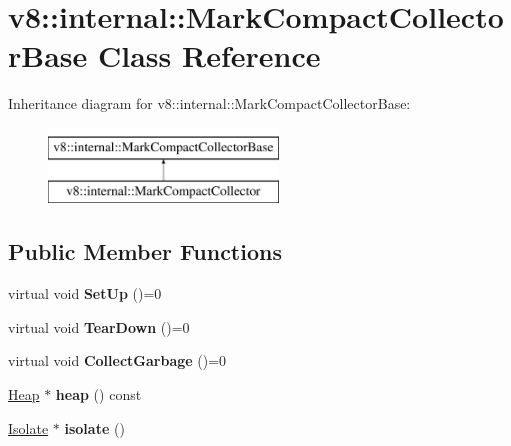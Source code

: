 \hypertarget{classv8_1_1internal_1_1MarkCompactCollectorBase}{}\section{v8\+:\+:internal\+:\+:Mark\+Compact\+Collector\+Base Class Reference}
\label{classv8_1_1internal_1_1MarkCompactCollectorBase}
Inheritance diagram for v8\+:\+:internal\+:\+:Mark\+Compact\+Collector\+Base\+:\begin{figure}[H]
\begin{center}
\leavevmode
\includegraphics[height=2.000000cm]{classv8_1_1internal_1_1MarkCompactCollectorBase}
\end{center}
\end{figure}
\subsection*{Public Member Functions}
\begin{DoxyCompactItemize}
\item 
\mbox{\label{classv8_1_1internal_1_1MarkCompactCollectorBase_ace841a22145c47a627b29cfe3a0758b0}} 
virtual void {\bfseries Set\+Up} ()=0
\item 
\mbox{\label{classv8_1_1internal_1_1MarkCompactCollectorBase_ab89541bec7384374725dcc50c395ad1b}} 
virtual void {\bfseries Tear\+Down} ()=0
\item 
\mbox{\label{classv8_1_1internal_1_1MarkCompactCollectorBase_a5a524c040e67874931db9c5c9191b05e}} 
virtual void {\bfseries Collect\+Garbage} ()=0
\item 
\mbox{\label{classv8_1_1internal_1_1MarkCompactCollectorBase_a133d0aafbb3dcdcb1e33186c5bc3b4b4}} 
\mbox{\hyperlink{classv8_1_1internal_1_1Heap}{Heap}} $\ast$ {\bfseries heap} () const
\item 
\mbox{\label{classv8_1_1internal_1_1MarkCompactCollectorBase_a9caa2bdaa6249067b9b39b06b20cb7cc}} 
\mbox{\hyperlink{classv8_1_1internal_1_1Isolate}{Isolate}} $\ast$ {\bfseries isolate} ()
\end{DoxyCompactItemize}
